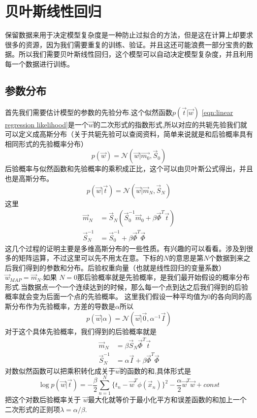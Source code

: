 \documentclass[a4paper]{article}
\begin{document}
\section{贝叶斯线性回归}
保留数据来用于决定模型复杂度是一种防止过拟合的方法，但是这在计算上却要求很多的资源，因为我们需要重复的训练、验证。并且这还可能浪费一部分宝贵的数据。所以我们需要贝叶斯线性回归，这个模型可以自动决定模型复杂度，并且利用每一个数据进行训练。
\subsection{参数分布}
首先我们需要估计模型的参数的先验分布.这个似然函数$p(\vec{t}|\vec{w})$ \ref{eqn:linear regression likelihood}是一个$\vec{w}$的二次形式的指数形式,所以对应的共轭先验我们就可以定义成高斯分布（关于共轭先验可以查阅资料，简单来说就是和后验概率具有相同形式的先验概率分布）
\begin{equation}
p(\vec{w}) = \mathcal{N}(\vec{w}|\vec{m_0},\vec{S}_0)
\end{equation}
后验概率与似然函数和先验概率的乘积成正比，这个可以由贝叶斯公式得出，并且也是高斯分布。
\begin{equation}\label{eqn:Bayes linear regression posterior}
p(\vec{w}|\vec{t}) = \mathcal{N}(\vec{w}|\vec{m}_N,\vec{S}_N)
\end{equation}
这里
\begin{align}
\vec{m}_N &=\vec{S}_N(\vec{S}_0^{-1}\vec{m}_0+\beta\vec{\Phi}^T\vec{t})\\
\vec{S}_N^{-1} &= \vec{S}_0^{-1}+\beta\vec{\Phi}^T\vec{\Phi}
\end{align}
这几个过程的证明主要是多维高斯分布的一些性质。有兴趣的可以看看。涉及到很多的矩阵运算，不过这里可以先不用太在意。下标的$N$的意思是第$N$个数据到来之后我们得到的参数和分布。后验权重向量（也就是线性回归的变量系数）$\vec{w}_{MAP}=\vec{m}_{N}$.如果 $N=0$那后验概率就是先验概率，是我们最开始假设的概率分布形式.当数据点一个一个连续达到的时候，那么每一个点到达之后我们得到的后验概率就会变为后面一个点的先验概率。
这里我们假设一种平均值为0的各向同的高斯分布作为先验概率，方差的导数是$\alpha$所以
\begin{equation}
p(\vec{w}|\alpha) = \mathcal{N}(\vec{w}|\vec{0},\alpha^{-1}\vec{I})
\end{equation}
对于这个具体先验概率，我们得到的后验概率就是
\begin{align}
\vec{m}_N &=\beta\vec{S}_N\vec{\Phi}^T\vec{t} \\
\vec{S}_N^{-1}&=\alpha\vec{I}+\beta\vec{\Phi}^T\vec{\Phi}
\end{align}
对数似然函数可以把乘积转化成关于$\vec{w}$的函数的和,具体形式是
\begin{equation}
\log p(\vec{w}|\vec{t}) = 
-\dfrac{\beta}{2}\sum_{n=1}^{N}\{t_n-\vec{w}^T\phi(\vec{x}_n) \}^2-\dfrac{\alpha}{2}\vec{w}^T\vec{w}+const
\end{equation}
把这个对数后验概率关于 $\vec{w}$最大化就等价于最小化平方和误差函数的和加上一个二次形式的正则项$\lambda=\alpha/\beta$.
\end{document}
